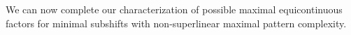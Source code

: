 \documentclass[11pt,reqno]{amsart}
\newtheorem{theorem}{Theorem}[section]
\theoremstyle{definition}
\theoremstyle{plain}
\newcommand{\AuthornoteR}[2]{{\sf\small\color{blue}{[#1: #2]}}}
\newcommand{\rp}{\AuthornoteR{R}}
\begin{document}





We can now complete our characterization of possible maximal equicontinuous factors for minimal subshifts with non-superlinear maximal pattern complexity.

\end{document}
